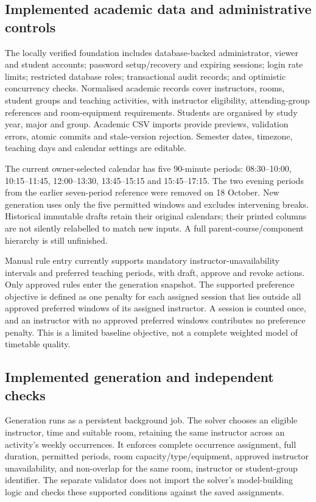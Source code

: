 \documentclass[
  11pt,a4paper,oneside]{report}
\begin{document}
\subsection{Implemented academic data and administrative controls}
The locally verified foundation includes database-backed administrator, viewer and student accounts; password setup/recovery and expiring sessions; login rate limits; restricted database roles; transactional audit records; and optimistic concurrency checks. Normalised academic records cover instructors, rooms, student groups and teaching activities, with instructor eligibility, attending-group references and room-equipment requirements. Students are organised by study year, major and group. Academic CSV imports provide previews, validation errors, atomic commits and stale-version rejection. Semester dates, timezone, teaching days and calendar settings are editable.

The current owner-selected calendar has five 90-minute periods: 08:30--10:00, 10:15--11:45, 12:00--13:30, 13:45--15:15 and 15:45--17:15. The two evening periods from the earlier seven-period reference were removed on 18 October. New generation uses only the five permitted windows and excludes intervening breaks. Historical immutable drafts retain their original calendars; their printed columns are not silently relabelled to match new inputs. A full parent-course/component hierarchy is still unfinished.

Manual rule entry currently supports mandatory instructor-unavailability intervals and preferred teaching periods, with draft, approve and revoke actions. Only approved rules enter the generation snapshot. The supported preference objective is defined as one penalty for each assigned session that lies outside all approved preferred windows of its assigned instructor. A session is counted once, and an instructor with no approved preferred windows contributes no preference penalty. This is a limited baseline objective, not a complete weighted model of timetable quality.

\subsection{Implemented generation and independent checks}
Generation runs as a persistent background job. The solver chooses an eligible instructor, time and suitable room, retaining the same instructor across an activity's weekly occurrences. It enforces complete occurrence assignment, full duration, permitted periods, room capacity/type/equipment, approved instructor unavailability, and non-overlap for the same room, instructor or student-group identifier. The separate validator does not import the solver's model-building logic and checks these supported conditions against the saved assignments.
\end{document}
